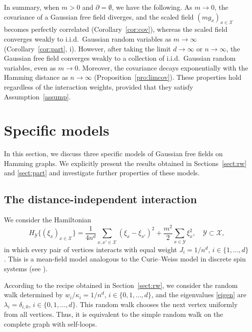 \documentclass[a4paper,11pt]{article}
\theoremstyle{plain}
\theoremstyle{definition}
\begin{document}
In summary, when $m>0$ and $\partial=\emptyset$,
we have the following. As $m\to 0$, the covariance of
a Gaussian free field diverges, and the scaled field
$(mg_x)_{x\in\mathcal{X}}$ becomes perfectly correlated
(Corollary~\ref{cor:cov}), whereas the scaled field
converges weakly to i.i.d.\ Gaussian random variables
as $m\to\infty$ (Corollary~\ref{cor:part}, i).
However, after taking the limit $d\to\infty$ or
$n\to\infty$, the Gaussian free field converges weakly
to a collection of i.i.d.\ Gaussian random variables,
even as $m\to 0$. Moreover, the covariance decays
exponentially with the Hamming distance as $n\to\infty$
(Proposition~\ref{pro:limcov}). These properties hold
regardless of the interaction weights, provided that
they satisfy Assumption~\ref{assump}.

\section{Specific models}
\label{sect:model}

In this section, we discuss three specific models of
Gaussian free fields on Hamming graphs. We explicitly
present the results obtained in Sections~\ref{sect:rw}
and \ref{sect:part} and investigate further properties
of these models.

\subsection{The distance-independent interaction}
\label{sect:model:ind}

We consider the Hamiltonian
\begin{equation}\label{ham:mean}
  H_\mathcal{Y}\{(\xi_x)_{x\in\mathcal{X}}\}
  =\frac{1}{4n^d}\sum_{x,x'\in\mathcal{X}}
  (\xi_x-\xi_{x'})^2
  +\frac{m^2}{2}\sum_{x\in\mathcal{Y}} \xi_x^2,
  \quad \mathcal{Y}\subset\mathcal{X},
\end{equation}
in which every pair of vertices interacts with equal
weight $J_i=1/n^d$, $i\in\{1,\ldots,d\}$. This is
a mean-field model analogous to the Curie--Weiss model
in discrete spin systems (see \cite[Chapter 2]{FV17}).

According to the recipe obtained in Section~\ref{sect:rw},
we consider the random walk determined by
$w_i/\kappa_i=1/n^d$, $i\in\{0,1,\ldots,d\}$,
and the eigenvalues \eqref{eigen} are
$\lambda_i=\delta_{i,0}$, $i\in\{0,1,\ldots,d\}$.
This random walk chooses the next vertex uniformly
from all vertices. Thus, it is equivalent to the simple
random walk on the complete graph with self-loops.
\end{document}
